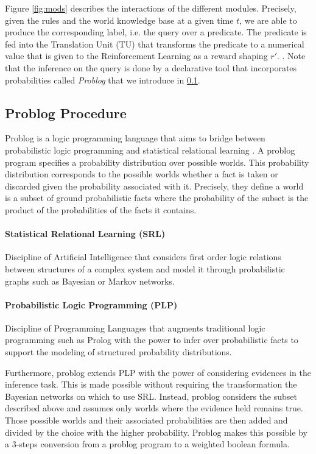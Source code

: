 Figure \ref{fig:mods} describes the interactions of the different modules. Precisely, 
given the rules and the world knowledge base at a given time $t$, we are able 
to produce the corresponding label, i.e. the query over a predicate. The predicate is fed 
into the Translation Unit (TU) that transforms the predicate to a numerical value that is given to the Reinforcement Learning 
as a reward shaping $r'$. . Note that the inference on the query is done by a declarative tool that incorporates 
probabilities called \emph{Problog} that we introduce in \ref{sec:problog}.


\subsection{Problog Procedure} 
\label{sec:problog}
Problog is a logic programming language that aims to bridge between probabilistic 
logic programming and statistical relational learning \cite{fierens_van}. 
A problog program specifies a probability distribution over possible worlds. 
This probability distribution corresponds to the possible worlds whether a fact is taken 
or discarded given the probability associated with it. Precisely, they define a world 
is a subset of ground probabilistic facts where the probability of the subset is the product of 
the probabilities of the facts it contains.

\paragraph{Statistical Relational Learning (SRL)}
    Discipline of Artificial Intelligence that considers first order logic relations between 
    structures of a complex system and model it through probabilistic graphs such as Bayesian or 
    Markov networks.

\paragraph{Probabilistic Logic Programming (PLP)}
    Discipline of Programming Languages that augments traditional logic programming such as Prolog 
    with the power to infer over probabilistic facts to support the modeling of structured 
    probability distributions.


Furthermore, problog extends PLP with the power of considering evidences 
in the inference task. This is made possible without requiring the transformation 
the Bayesian networks on which to use SRL. Instead, problog considers the subset described above 
and assumes only worlds where the evidence held remains true. Those possible worlds and their associated 
probabilities are then added and divided by the choice with the higher probability. Problog makes this 
possible by a 3-steps conversion from a problog program to a weighted boolean formula.

